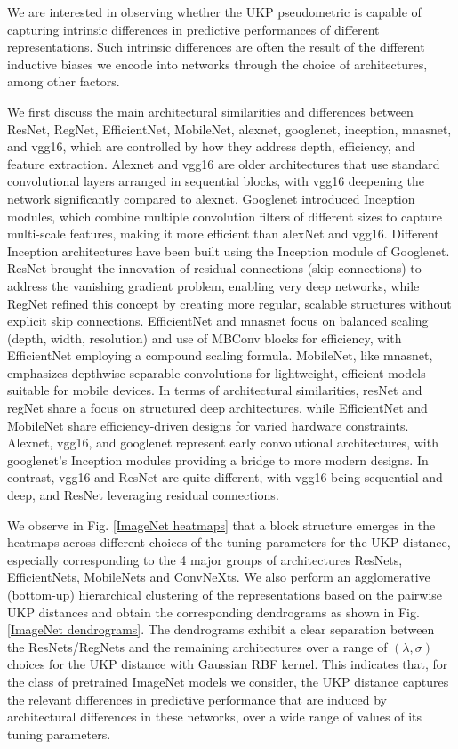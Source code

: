 \documentclass[11pt]{article}
\newcommand{\metricstname}{UKP }
\theoremstyle{plain}
\begin{document}
We are interested in observing whether the \metricstname pseudometric is capable of capturing intrinsic differences in predictive performances of different representations. Such intrinsic differences are often the result of the different inductive biases we encode into networks through the choice of architectures, among other factors. 

We first discuss the main architectural similarities and differences between ResNet, RegNet, EfficientNet, MobileNet, alexnet, googlenet, inception, mnasnet, and vgg16, which are controlled by how they address depth, efficiency, and feature extraction. Alexnet and vgg16 are older architectures that use standard convolutional layers arranged in sequential blocks, with vgg16 deepening the network significantly compared to alexnet. Googlenet introduced Inception modules, which combine multiple convolution filters of different sizes to capture multi-scale features, making it more efficient than alexNet and vgg16. Different Inception architectures have been built using the Inception module of Googlenet. ResNet brought the innovation of residual connections (skip connections) to address the vanishing gradient problem, enabling very deep networks, while RegNet refined this concept by creating more regular, scalable structures without explicit skip connections. EfficientNet and mnasnet focus on balanced scaling (depth, width, resolution) and use of MBConv blocks for efficiency, with EfficientNet employing a compound scaling formula. MobileNet, like mnasnet, emphasizes depthwise separable convolutions for lightweight, efficient models suitable for mobile devices. In terms of architectural similarities, resNet and regNet share a focus on structured deep architectures, while EfficientNet and MobileNet share efficiency-driven designs for varied hardware constraints. Alexnet, vgg16, and googlenet represent early convolutional architectures, with googlenet’s Inception modules providing a bridge to more modern designs. In contrast, vgg16 and ResNet are quite different, with vgg16 being sequential and deep, and ResNet leveraging residual connections.

We observe in Fig. \ref{ImageNet heatmaps} that a block structure emerges in the heatmaps across different choices of the tuning parameters for the \metricstname distance, especially corresponding to the 4 major groups of architectures ResNets, EfficientNets, MobileNets and ConvNeXts. We also perform an agglomerative (bottom-up) hierarchical clustering of the representations based on the pairwise \metricstname distances and obtain the corresponding dendrograms as shown in Fig. \ref{ImageNet dendrograms}. The dendrograms exhibit a clear separation between the ResNets/RegNets and the remaining architectures over a range of $(\lambda,\sigma)$ choices for the \metricstname distance with Gaussian RBF kernel. This indicates that, for the class of pretrained ImageNet models we consider, the \metricstname distance captures the relevant differences in predictive performance that are induced by architectural differences in these networks, over a wide range of values of its tuning parameters.
\end{document}
